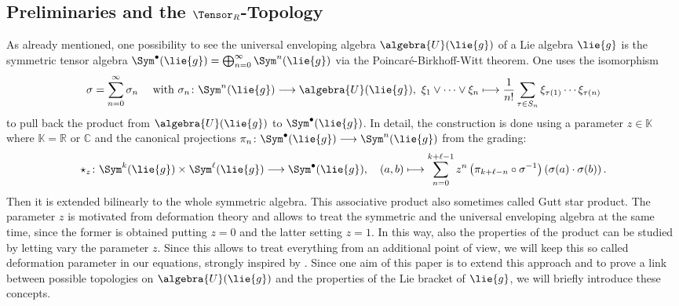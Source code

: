 \documentclass[
11pt,                          %
english                        %
]{article}
\begin{document}
\subsection{Preliminaries and the $\Tensor_R$-Topology}
As already mentioned, one possibility to see the universal enveloping algebra 
$\algebra{U}(\lie{g})$ of a Lie algebra $\lie{g}$ is the symmetric tensor algebra 
$\Sym^{\bullet}(\lie{g}) = \bigoplus_{n=0}^\infty \Sym^n(\lie{g})$ via the 
Poincar\'e-Birkhoff-Witt theorem. One uses the isomorphism
\begin{equation}
	\label{eq:pbw-isomorphism}
	\sigma
	=
	\sum\limits_{n=0}^\infty
	\sigma_n
	\quad \text{ with }
	\sigma_n
	\colon
	\Sym^n(\lie{g})
	\longrightarrow
	\algebra{U}(\lie{g})
	, \
	\xi_1 \vee \cdots \vee \xi_n
	\longmapsto
	\frac{1}{n!}
	\sum\limits_{\tau \in S_n}
	\xi_{\tau(1)} \cdots \xi_{\tau(n)}
\end{equation}
to pull back the product from $\algebra{U}(\lie{g})$ to $\Sym^{\bullet}(\lie{g})$. 
In detail, the construction is done using a parameter $z \in \mathbb{K}$ where 
$\mathbb{K} = \mathbb{R}$ or $\mathbb{C}$ and the canonical projections $\pi_n 
\colon \Sym^{\bullet}(\lie{g}) \longrightarrow \Sym^n(\lie{g})$ from the grading:
\begin{equation}
	\label{eq:starproduct}
	\star_z
	\colon
	\Sym^k(\lie{g})
	\times
	\Sym^\ell(\lie{g})
	\longrightarrow
	\Sym^{\bullet}(\lie{g})
	, \quad
	(a, b)
	\longmapsto
	\sum\limits_{n=0}^{k + \ell - 1}
	z^n
	\left( \pi_{k + \ell - n} \circ \sigma^{-1} \right)
	\left(
		\sigma(a)
		\cdot
		\sigma(b)
	\right).
\end{equation}
Then it is extended bilinearly to the whole symmetric algebra. This associative 
product also sometimes called Gutt star product.
The parameter $z$ is motivated from deformation theory and allows to treat the 
symmetric and the universal enveloping algebra at the same time, since the former is 
obtained putting $z = 0$ and the latter setting $z = 1$. In this way, also the 
properties of the product can be studied by letting vary the parameter $z$. Since 
this allows to treat everything from an additional point of view, we will keep this 
so called deformation parameter in our equations, strongly inspired by
\cite{esposito.stapor.waldmann:2015a:pre}. Since one aim of this paper is to extend 
this approach and to prove a link between possible topologies on $\algebra{U}
(\lie{g})$ and the properties of the Lie bracket of $\lie{g}$, we will briefly
introduce these concepts.
\end{document}
